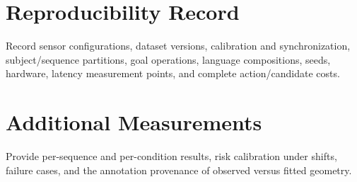 \section{Reproducibility Record}
Record sensor configurations, dataset versions, calibration and synchronization, subject/sequence partitions, goal operations, language compositions, seeds, hardware, latency measurement points, and complete action/candidate costs.
\section{Additional Measurements}
Provide per-sequence and per-condition results, risk calibration under shifts, failure cases, and the annotation provenance of observed versus fitted geometry.

